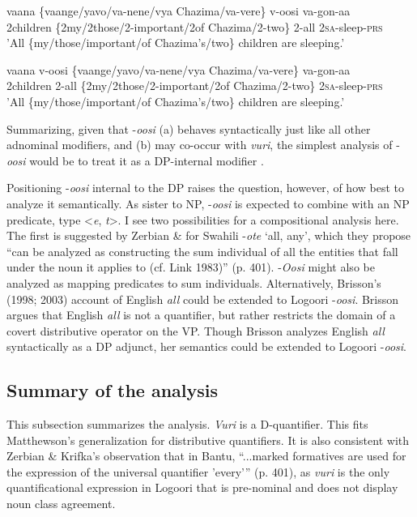 \documentclass[output=paper]{langsci/langscibook}
\begin{document}
\ea 
\gll vaana  \textup{\{}vaange\textup{/}yavo\textup{/}va-nene/vya Chazima/va-vere\}  v-oosi  va-gon-aa\\
     2children  \{2my/2those/2-important/2of Chazima/2-two\}  2-all  2\textsc{sa}{}-sleep-\textsc{prs}\\
\glt 'All \{my/those/important/of Chazima's/two\} children are sleeping.'  
\z

\ea
\gll vaana  v-oosi\textup{   \{}vaange\textup{/}yavo\textup{/}va-nene/vya Chazima/va-vere\}  va-gon-aa\\
     2children  2-all   \{2my/2those/2-important/2of Chazima/2-two\}  2\textsc{sa}{}-sleep-\textsc{prs}\\
     'All \{my/those/important/of Chazima's/two\} children are sleeping.'  \\
\z

  Summarizing, given that -\textit{oosi} (a) behaves syntactically just like all other adnominal modifiers, and (b) may co-occur with \textit{vuri}, the simplest analysis of -\textit{oosi} would be to treat it as a DP-internal modifier .

  Positioning -\textit{oosi} internal to the DP raises the question, however, of how best to analyze it semantically. As sister to NP, -\textit{oosi} is expected to combine with an NP predicate, type <\textit{e},\textit{ t}>. I see two possibilities for a compositional analysis here. The first is suggested by Zerbian \& \citet{Krifka2008} for Swahili -\textit{ote} ‘all, any’, which they propose “can be analyzed as constructing the sum individual of all the entities that fall under the noun it applies to (cf. Link 1983)” (p. 401). -\textit{Oosi} might also be analyzed as mapping predicates to sum individuals. Alternatively, Brisson’s (1998; 2003) account of English \textit{all} could be extended to Logoori -\textit{oosi}. Brisson argues that English \textit{all} is not a quantifier, but rather restricts the domain of a covert distributive operator on the VP. Though Brisson analyzes English \textit{all} syntactically as a DP adjunct, her semantics could be extended to Logoori -\textit{oosi}. 

\subsection{Summary of the analysis}

  This subsection summarizes the analysis. \textit{Vuri} is a D-quantifier. This fits Matthewson's generalization for distributive quantifiers. It is also consistent with Zerbian \& Krifka's observation that in Bantu, “...marked formatives are used for the expression of the universal quantifier 'every'” (p. 401), as \textit{vuri} is the only quantificational expression in Logoori that is pre-nominal and does not display noun class agreement. 
\end{document}
